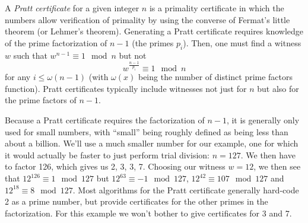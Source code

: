 \documentclass[12pt]{article}
\begin{document}
A {\em Pratt certificate} for a given integer $n$ is a primality certificate in which the numbers allow verification of primality by using the converse of Fermat's little theorem (or Lehmer's theorem). Generating a Pratt certificate requires knowledge of the prime factorization of $n - 1$ (the primes $p_i$). Then, one must find a witness $w$ such that $w^{n - 1} \equiv 1 \mod n$ but not $$w^{\frac{n - 1}{p_i}} \equiv 1 \mod n$$ for any $i \leq \omega(n - 1)$ (with $\omega(x)$ being the number of distinct prime factors function). Pratt certificates typically include witnesses not just for $n$ but also for the prime factors of $n - 1$.

Because a Pratt certificate requires the factorization of $n - 1$, it is generally only used for small numbers, with ``small'' being roughly defined as being less than about a billion. We'll use a much smaller number for our example, one for which it would actually be faster to just perform trial division: $n = 127$. We then have to factor 126, which gives us 2, 3, 3, 7. Choosing our witness $w = 12$, we then see that $12^{126} \equiv 1 \mod 127$ but $12^{63} \equiv -1 \mod 127$, $12^{42} \equiv 107 \mod 127$ and $12^{18} \equiv 8 \mod 127$. Most algorithms for the Pratt certificate generally hard-code 2 as a prime number, but provide certificates for the other primes in the factorization. For this example we won't bother to give certificates for 3 and 7.
\end{document}

